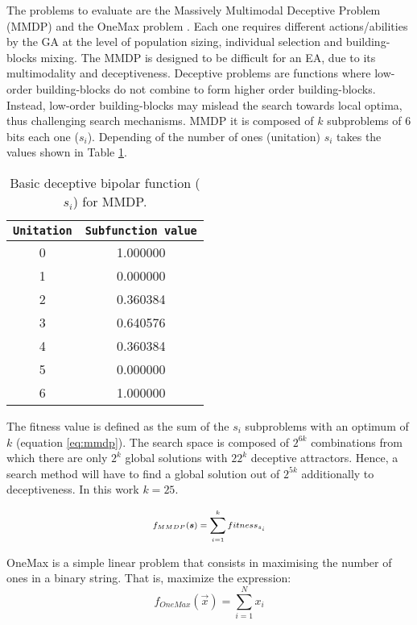 The problems to evaluate are the Massively Multimodal Deceptive Problem (MMDP) \cite{goldberg92massive} and the OneMax problem \cite{ONEMAX}. Each one requires different actions/abilities by the GA at the level of population sizing, individual selection and building-blocks mixing. The MMDP
 is designed to be difficult for an EA, due to
its multimodality and deceptiveness. Deceptive problems are functions where low-order building-blocks do not combine to form higher order building-blocks. Instead, low-order building-blocks may mislead the search towards local optima, thus challenging search mechanisms. MMDP it is composed of $k$ subproblems of 6 bits each one ($s_i$). Depending of
the number of ones (unitation) $s_i$ takes the values shown in Table \ref{table:mmdp}.  

\begin{table}[h]

\centering
{%
\caption{ Basic deceptive bipolar function ($s_i$) for MMDP.}
\begin{tabular}{|c|c|}
\hline
\texttt{Unitation}&\texttt{Subfunction value}\\
\hline
0 & 1.000000 \\
\hline
1 & 0.000000 \\
\hline
2 & 0.360384 \\
\hline
3 & 0.640576\\
\hline
4 & 0.360384\\
\hline
5 & 0.000000\\
\hline
6 & 1.000000\\
\hline

\end{tabular}
}

\label{table:mmdp}
\end{table}



The fitness value is defined as the sum of the $s_i$ subproblems with an optimum of $k$ (equation \ref{eq:mmdp}).
The search space is composed of $2^{6k}$ combinations from which there
are only $2^k$ global solutions with $22^k$ deceptive
attractors. Hence, a search method will have to find a global solution
out of $2^{5k}$ additionally to deceptiveness. In this work $k=25$. 

\begin{equation}\label{eq:mmdp}
\scriptsize
f_{MMDP}(\vec s)= \sum_{i=1}^{k} fitness_{s_i}
\end{equation}

OneMax is a simple linear problem that consists in maximising the number of ones in a binary string. That is, maximize the expression:
\begin{equation}
f_{OneMax}(\vec{x}) = \sum_{i=1}^{N}{x_{i}}
\end{equation}


